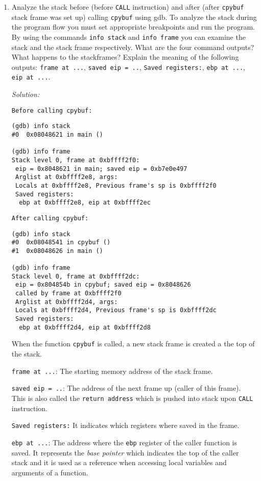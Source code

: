 \documentclass[a4paper,11pt]{article}
\newenvironment{solution}%
{\par{\noindent\small\textit{Solution:}}\vspace{-12pt}\begin{framed}}%
{\end{framed}\par}
\begin{document}
\begin{enumerate}
\item Analyze the stack before (before \texttt{CALL} instruction) and after
(after \texttt{cpybuf} stack frame was set up) calling \texttt{cpybuf} using gdb.
To analyze the stack during the program flow you must set appropriate breakpoints
and run the program. By using the commands \texttt{info stack} and \texttt{info
frame} you can examine the stack and the stack frame respectively. What are the
four command outputs? What happens to the stackframes? Explain the meaning of the 
following outputs:
\verb|frame at ...|, 
\verb|saved eip = ..|, 
\verb|Saved registers:|, 
\verb|ebp at ...|, 
\verb|eip at ...|.
\ifsolution
\begin{solution}

\verb|Before calling cpybuf:|
\begin{lstlisting}
(gdb) info stack
#0  0x08048621 in main ()

(gdb) info frame
Stack level 0, frame at 0xbffff2f0:
 eip = 0x8048621 in main; saved eip = 0xb7e0e497
 Arglist at 0xbffff2e8, args:
 Locals at 0xbffff2e8, Previous frame's sp is 0xbffff2f0
 Saved registers:
  ebp at 0xbffff2e8, eip at 0xbffff2ec
\end{lstlisting}

\verb|After calling cpybuf:|
\begin{lstlisting}
(gdb) info stack
#0  0x08048541 in cpybuf ()
#1  0x08048626 in main ()

(gdb) info frame
Stack level 0, frame at 0xbffff2dc:
 eip = 0x804854b in cpybuf; saved eip = 0x8048626
 called by frame at 0xbffff2f0
 Arglist at 0xbffff2d4, args:
 Locals at 0xbffff2d4, Previous frame's sp is 0xbffff2dc
 Saved registers:
  ebp at 0xbffff2d4, eip at 0xbffff2d8
\end{lstlisting}

When the function \texttt{cpybuf} is called, a new stack frame is created a the top of the stack.

\verb|frame at ...|: The starting memory address of the stack frame.

\verb|saved eip = ..|: The address of the next frame up (caller of this frame). This is also called the \texttt{return address} which is pushed into stack upon \texttt{CALL} instruction.  

\verb|Saved registers:| It indicates which registers where saved in the frame.

\verb|ebp at ...|: The address where the \texttt{ebp} register of the caller function is saved. It represents the \emph{base pointer} which indicates the top of the caller stack and it is used as a reference when accessing local variables and arguments of a function.


\end{solution}
\end{enumerate}
\end{document}
